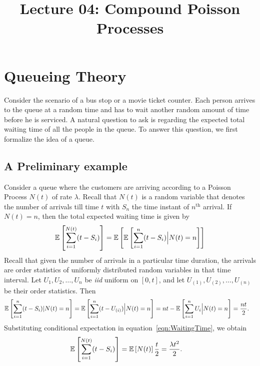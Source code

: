 \documentclass[a4paper,english,10pt]{article}
\title{Lecture 04: Compound Poisson Processes}
\author{}
\date{}
\begin{document}
\maketitle

\section{Queueing Theory}
Consider the scenario of a bus stop or a movie ticket counter. Each person arrives to the queue at a random time and has to wait another random amount of time before he is serviced. A natural question to ask is regarding the expected total waiting time of all the people in the queue. To answer this question, we first formalize the idea of a queue.
\subsection{A Preliminary example}
Consider a queue where the customers are arriving according to a Poisson Process $N(t)$ of rate $\lambda$. Recall that $N(t)$ is a random variable that denotes the number of arrivals till time $t$ with $S_n$ the time instant of $n^{\text{th}}$ arrival. 
If $N(t)=n$, then the total expected waiting time is given by
\begin{align}
\label{eqn:WaitingTime}
\mathbb{E}\left[\sum_{i=1}^{N(t)}(t-S_i)\right]=\mathbb{E}\left[\mathbb{E}\left[\sum_{i=1}^{n}(t-S_i)\Big|N(t)=n\right]\right]
\end{align}
Recall that given the number of arrivals in a particular time duration, the arrivals are order statistics of uniformly distributed random variables in that time interval. 
Let $U_1, U_2, \ldots, U_n$ be \emph{iid}  uniform on $[0,t]$, and let $U_{(1)},U_{(2)},\ldots,U_{(n)}$ be their order statistics. 
Then
\begin{align*}
\mathbb{E}\left[\sum_{i=1}^{n}(t-S_i)|N(t)=n\right] &= \mathbb{E}\left[\sum_{i=1}^{n}(t-U_{(i)})\Big| N(t)=n\right]
	= nt-\mathbb{E}\left[\sum_{i=1}^{n}U_i \Big| N(t)=n\right]
	= \frac{nt}{2}.
\end{align*}
Substituting conditional expectation in equation~\ref{eqn:WaitingTime}, we obtain
\begin{align*}
\E\left[\sum_{i=1}^{N(t)}(t-S_i)\right] %
&= \E\left[N(t)\right]\frac{t}{2} = \frac{\lambda t^2}{2}.
\end{align*}
\end{document}
